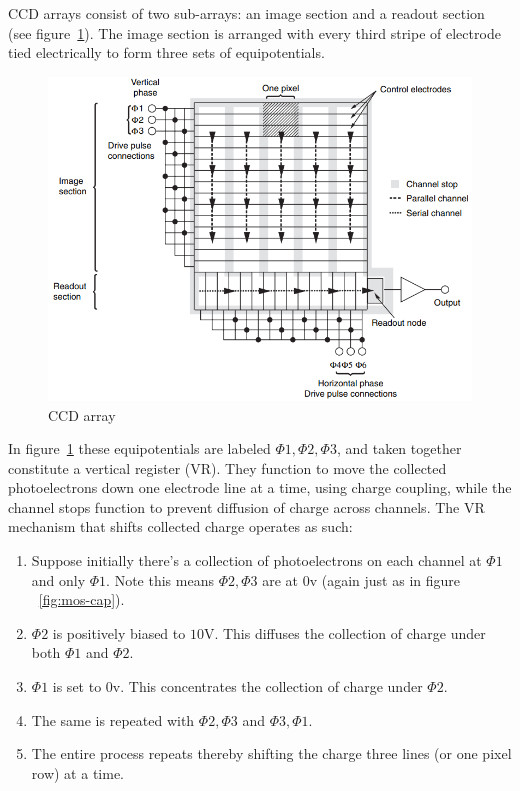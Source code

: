 CCD arrays consist of two sub-arrays: an image section and a readout section (see figure~\ref{fig:ccd-array}).
%
The image section is arranged with every third stripe of electrode tied electrically to form three sets of equipotentials.
\begin{figure}
    \includegraphics[width=\linewidth,keepaspectratio]{figures/ccd_array.png}
    \caption{CCD array\cite{pawley1995handbook}}
    \label{fig:ccd-array}
\end{figure}
%
In figure~\ref{fig:ccd-array} these equipotentials are labeled $\Phi1, \Phi2, \Phi3$, and taken together constitute a vertical register (VR).
%
They function to move the collected photoelectrons down one electrode line at a time, using charge coupling, while the channel stops function to prevent diffusion of charge across channels.
%
The VR mechanism that shifts collected charge operates as such:
\begin{enumerate}
    \item Suppose initially there's a collection of photoelectrons on each channel at $\Phi1$ and only $\Phi1$. Note this means $\Phi2, \Phi3$ are at $0$v (again just as in figure ~\ref{fig:mos-cap}).
    \item $\Phi2$ is positively biased to $10$V. This diffuses the collection of charge under both $\Phi1$ and $\Phi2$.
    \item $\Phi1$ is set to $0$v. This concentrates the collection of charge under $\Phi2$.
    \item The same is repeated with $\Phi2, \Phi3$ and $\Phi3, \Phi1$.
    \item The entire process repeats thereby shifting the charge three lines (or one pixel row) at a time.
\end{enumerate}
